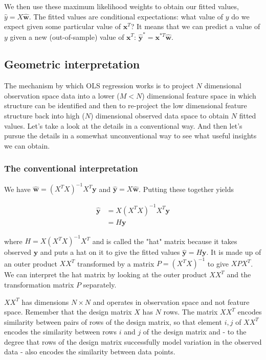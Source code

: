 \documentclass[11pt]{article}
\begin{document}
	We then use these maximum likelihood weights to obtain our fitted values, $\hat{y} = X\boldsymbol{\hat{w}}$. The fitted values are conditional expectations: what value of $y$ do we expect given some particular value of $\boldsymbol{x}^{T}$? It means that we can predict a value of $y$ given a new (out-of-sample) value of $\boldsymbol{x}^{T}$: $\boldsymbol{\hat{y}^{*}} = \boldsymbol{x}^{*T}\boldsymbol{\hat{w}}$.
	
	\subsection{Geometric interpretation}
	
	The mechanism by which OLS regression works is to project $N$ dimensional observation space data into a lower ($M < N$) dimensional feature space in which structure can be identified and then to re-project the low dimensional feature structure back into high ($N$) dimensional observed data space to obtain $N$ fitted values. Let's take a look at the details in a conventional way. And then let's pursue the details in a somewhat unconventional way to see what useful insights we can obtain.
	
	\subsubsection{The conventional interpretation}
	
	We have $\boldsymbol{\hat{w}} = (X^{T}X)^{-1}X^{T}\boldsymbol{y}$ and $\boldsymbol{\hat{y}} = X\boldsymbol{\hat{w}}$. Putting these together yields
	
	\begin{align*}
		\boldsymbol{\hat{y}} &= X(X^{T}X)^{-1}X^{T}\boldsymbol{y} \\
		&= H\boldsymbol{y}
	\end{align*}
	
	where $H = X(X^{T}X)^{-1}X^{T}$ and is called the "hat" matrix because it takes observed $\boldsymbol{y}$ and puts a hat on it to give the fitted values $\boldsymbol{\hat{y}} = H\boldsymbol{y}$. It is made up of an outer product $XX^{T}$ transformed by a matrix $P = (X^{T}X)^{-1}$ to give $XPX^{T}$. We can interpret the hat matrix by looking at the outer product $XX^{T}$ and the transformation matrix $P$ separately.
	
	$XX^{T}$ has dimensions $N \times N$ and operates in observation space and not feature space. Remember that the design matrix $X$ has $N$ rows. The matrix $XX^{T}$ encodes similarity between pairs of rows of the design matrix, so that element ${i, j}$ of $XX^{T}$ encodes the similarity between rows $i$ and $j$ of the design matrix and - to the degree that rows of the design matrix successfully model variation in the observed data - also encodes the similarity between data points.
	
\end{document}
